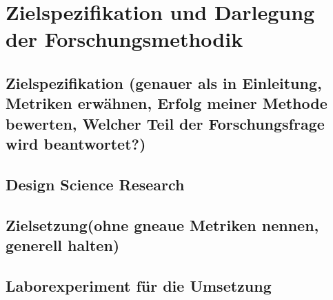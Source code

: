 \chapter{Zielspezifikation und Darlegung der Forschungsmethodik}


\section{Zielspezifikation (genauer als in Einleitung, Metriken erwähnen, Erfolg meiner Methode bewerten, Welcher Teil der Forschungsfrage wird beantwortet?)}
\section{Design Science Research }
\section{Zielsetzung(ohne gneaue Metriken nennen, generell halten)}
\section{Laborexperiment für die Umsetzung}

